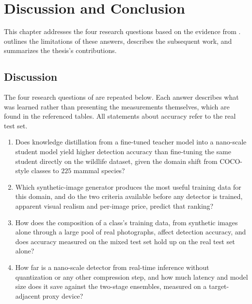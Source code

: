 \newpage
\cleardoublepage
\chapter{Discussion and Conclusion}\label{chapter:discussion_conclusion}

This chapter addresses the four research questions based on the evidence from .  outlines the limitations of these answers,  describes the subsequent work, and  summarizes the thesis's contributions.

\section{Discussion}\label{sec:discussion}

The four research questions of  are repeated below. Each answer describes what was learned rather than presenting the measurements themselves, which are found in the referenced tables. All statements about accuracy refer to the real test set.

\begin{enumerate}
    \item Does knowledge distillation from a fine-tuned teacher model into a nano-scale student model yield higher detection accuracy than fine-tuning the same student directly on the wildlife dataset, given the domain shift from COCO-style classes to $225$ mammal species?
    \item Which synthetic-image generator produces the most useful training data for this domain, and do the two criteria available before any detector is trained, apparent visual realism and per-image price, predict that ranking?
    \item How does the composition of a class's training data, from synthetic images alone through a large pool of real photographs, affect detection accuracy, and does accuracy measured on the mixed test set hold up on the real test set alone?
    \item How far is a nano-scale detector from real-time inference without quantization or any other compression step, and how much latency and model size does it save against the two-stage ensembles, measured on a target-adjacent proxy device?
\end{enumerate}

